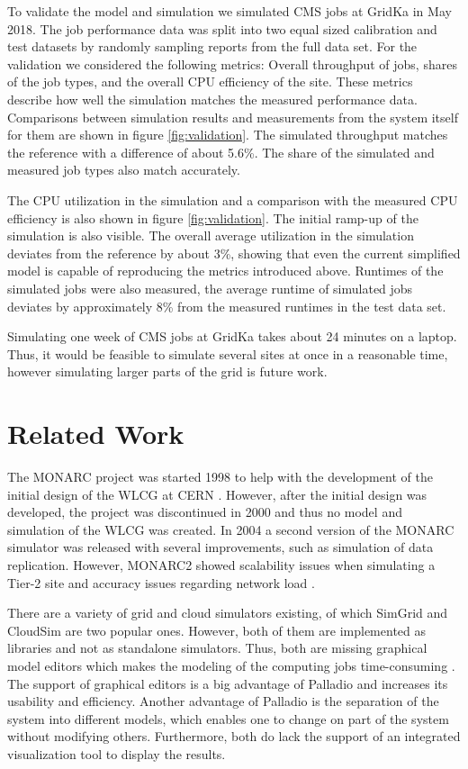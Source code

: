 \documentclass{webofc}
\begin{document}
To validate the model and simulation we simulated CMS jobs at GridKa in May 2018.
The job performance data was split into two equal sized calibration and test datasets by randomly sampling reports from the full data set.
For the validation we considered the following metrics: Overall throughput of jobs, shares of the job types, and the overall CPU efficiency of the site.
These metrics describe how well the simulation matches the measured performance data.
Comparisons between  simulation results and measurements from the system itself for them are shown in figure \ref{fig:validation}.
The simulated throughput matches the reference with a difference of about 5.6\%.
The share of the simulated and measured job types also match accurately.

The CPU utilization in the simulation and a comparison with the measured CPU efficiency is also shown in figure \ref{fig:validation}.
The initial ramp-up of the simulation is also visible.
The overall average utilization in the simulation deviates from the reference by about 3\%, showing that even the current simplified model is capable of reproducing the metrics introduced above.
Runtimes of the simulated jobs were also measured, the average runtime of simulated jobs deviates by approximately 8\% from the measured runtimes in the test data set.

Simulating one week of CMS jobs at GridKa takes about 24 minutes on a laptop.
Thus, it would be feasible to simulate several sites at once in a reasonable time, however simulating larger parts of the grid is future work.

\section{Related Work}
\label{related}
The MONARC project was started 1998 to help with the development of the initial design of the WLCG at CERN \cite{monarc2000models}.
However, after the initial design was developed, the project was discontinued in 2000 and thus no model and simulation of the WLCG was created. 
In 2004 a second version of the MONARC simulator was released with several improvements, such as simulation of data replication. However, MONARC2 showed scalability issues when simulating a Tier-2 site and accuracy issues regarding network load \cite{1742-6596-331-7-072038}.

There are a variety of grid and cloud simulators existing, of which SimGrid and CloudSim are two popular ones. 
However, both of them are implemented as libraries and not as standalone simulators. Thus, both are missing graphical model editors which makes the modeling of the computing jobs time-consuming \cite{simgrid,cloudsim}. The support of graphical editors is a big advantage of Palladio and increases its usability and efficiency. Another advantage of Palladio is the separation of the system into different models, which enables one to change on part of the system without modifying others. Furthermore, both do lack the support of an integrated visualization tool to display the results.  
\end{document}
